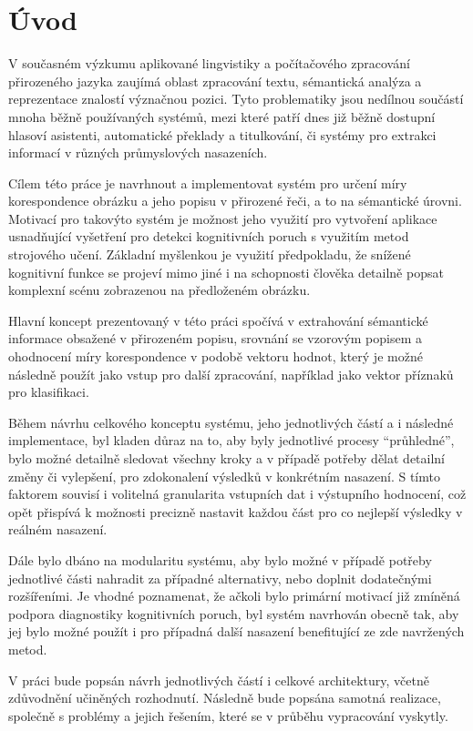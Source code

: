 \clearpage
\section{Úvod}
V současném výzkumu aplikované lingvistiky a počítačového zpracování přirozeného
jazyka zaujímá oblast zpracování textu, sémantická analýza a reprezentace znalostí význačnou pozici.
Tyto problematiky jsou nedílnou součástí mnoha běžně používaných systémů,
mezi které patří dnes již běžně dostupní hlasoví asistenti, automatické překlady a titulkování,
či systémy pro extrakci informací v různých průmyslových nasazeních.

Cílem této práce je navrhnout a implementovat systém pro určení míry korespondence obrázku a jeho popisu v přirozené řeči, a to na sémantické úrovni.
Motivací pro takovýto systém je možnost jeho využití pro vytvoření aplikace usnadňující vyšetření pro detekci kognitivních
poruch s využitím metod strojového učení.
Základní myšlenkou je využití předpokladu, že snížené kognitivní funkce se projeví mimo jiné
i na schopnosti člověka detailně popsat komplexní scénu zobrazenou na předloženém obrázku.

Hlavní koncept prezentovaný v této práci spočívá v extrahování sémantické informace obsažené v přirozeném popisu,
srovnání se vzorovým popisem a ohodnocení míry korespondence v podobě vektoru hodnot, který je možné
následně použít jako vstup pro další zpracování, například jako vektor příznaků pro klasifikaci.

Během návrhu celkového konceptu systému, jeho jednotlivých částí a i následné implementace, byl kladen důraz na to,
aby byly jednotlivé procesy \enquote{průhledné}, bylo možné detailně sledovat všechny kroky
a v případě potřeby dělat detailní změny či vylepšení, pro zdokonalení výsledků v konkrétním nasazení.
S tímto faktorem souvisí i volitelná granularita vstupních dat i výstupního hodnocení, což opět přispívá k možnosti precizně
nastavit každou část pro co nejlepší výsledky v reálném nasazení.

Dále bylo dbáno na modularitu systému, aby bylo možné v případě potřeby jednotlivé části nahradit za případné alternativy, nebo doplnit dodatečnými rozšířeními.
Je vhodné poznamenat, že ačkoli bylo primární motivací již zmíněná podpora diagnostiky kognitivních poruch,
byl systém navrhován obecně tak, aby jej bylo možné použít i pro případná další nasazení benefitující ze zde navržených metod.

V práci bude popsán návrh jednotlivých částí i celkové architektury, včetně zdůvodnění učiněných rozhodnutí.
Následně bude popsána samotná realizace, společně s problémy a jejich řešením, které se v průběhu vypracování vyskytly.
